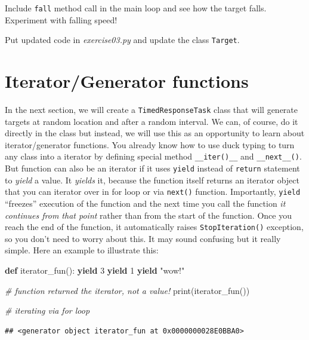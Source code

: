 \documentclass[
]{book}
\newenvironment{Shaded}{\begin{snugshade}}{\end{snugshade}}
\newcommand{\BuiltInTok}[1]{#1}
\newcommand{\CommentTok}[1]{\textcolor[rgb]{0.56,0.35,0.01}{\textit{#1}}}
\newcommand{\ControlFlowTok}[1]{\textcolor[rgb]{0.13,0.29,0.53}{\textbf{#1}}}
\newcommand{\DecValTok}[1]{\textcolor[rgb]{0.00,0.00,0.81}{#1}}
\newcommand{\KeywordTok}[1]{\textcolor[rgb]{0.13,0.29,0.53}{\textbf{#1}}}
\newcommand{\NormalTok}[1]{#1}
\newcommand{\StringTok}[1]{\textcolor[rgb]{0.31,0.60,0.02}{#1}}
\begin{document}
Include \texttt{fall} method call in the main loop and see how the target falls. Experiment with falling speed!

Put updated code in \emph{exercise03.py} and update the class \texttt{Target}.

\hypertarget{iteratorgenerator-functions}{%
\section{Iterator/Generator functions}\label{iteratorgenerator-functions}}

In the next section, we will create a \texttt{TimedResponseTask} class that will generate targets at random location and after a random interval. We can, of course, do it directly in the class but instead, we will use this as an opportunity to learn about iterator/generator functions. You already know how to use duck typing to turn any class into a iterator by defining special method \texttt{\_\_iter()\_\_} and \texttt{\_\_next\_\_()}. But function can also be an iterator if it uses \texttt{yield} instead of \texttt{return} statement to \emph{yield} a value. It \emph{yields} it, because the function itself returns an iterator object that you can iterator over in for loop or via \texttt{next()} function. Importantly, \texttt{yield} ``freezes'' execution of the function and the next time you call the function \emph{it continues from that point} rather than from the start of the function. Once you reach the end of the function, it automatically raises \texttt{StopIteration()} exception, so you don't need to worry about this. It may sound confusing but it really simple. Here an example to illustrate this:

\begin{Shaded}
\begin{Highlighting}[]
\KeywordTok{def}\NormalTok{ iterator\_fun():}
    \ControlFlowTok{yield} \DecValTok{3}
    \ControlFlowTok{yield} \DecValTok{1}
    \ControlFlowTok{yield} \StringTok{"wow!"}
  
\CommentTok{\# function returned the iterator, not a value!}
\BuiltInTok{print}\NormalTok{(iterator\_fun())}

\CommentTok{\# iterating via for loop}
\end{Highlighting}
\end{Shaded}

\begin{verbatim}
## <generator object iterator_fun at 0x0000000028E0BBA0>
\end{verbatim}
\end{document}
